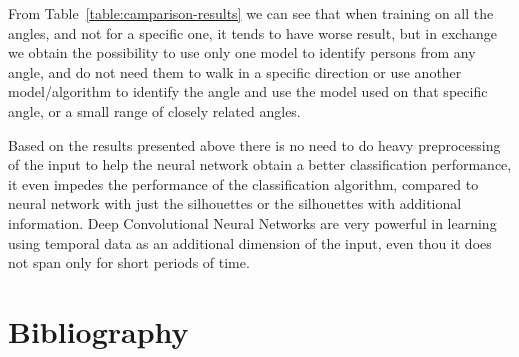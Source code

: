 \documentclass[12pt]{article}
\theoremstyle{definition}
\begin{document}
	From Table~\ref{table:camparison-results} we can see that when training on all the angles, and not for a specific one, it tends to have worse result, but in exchange we obtain the possibility to use only one model to identify persons from any angle, and do not need them to walk in a specific direction or use another model/algorithm to identify the angle and use the model used on that specific angle, or a small range of closely related angles.

	Based on the results presented above there is no need to do heavy preprocessing of the input to help the neural network obtain a better classification performance, it even impedes the performance of the classification algorithm, compared to neural network with just the silhouettes or the silhouettes with additional information. Deep Convolutional Neural Networks are very powerful in learning using temporal data as an additional dimension of the input, even thou it does not span only for short periods of time.

	\clearpage

	\section{Bibliography}
	
	
\end{document}
